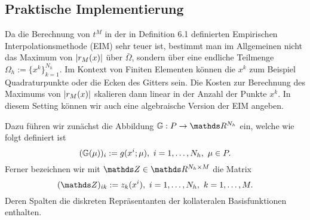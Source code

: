 \subsection{Praktische Implementierung}
Da die Berechnung von $t^M$ in der in Definition 6.1 definierten Empirischen Interpolationsmethode (EIM) sehr teuer ist, bestimmt man im Allgemeinen nicht das Maximum von $\left\vert r_M(x)\right\vert$ über $\bar{\Omega}$, sondern über eine endliche Teilmenge $\Omega_h := \{x^k\}_{k=1}^{N_h}$.
Im Kontext von Finiten Elementen können die $x^k$ zum Beispiel Quadraturpunkte oder die Ecken des Gitters sein.
Die Kosten zur Berechnung des Maximums von $\left\vert r_M(x)\right\vert$ skalieren dann linear in der Anzahl der Punkte $x^k$.
In diesem Setting können wir auch eine algebraische Version der EIM angeben.

Dazu führen wir zunächst die Abbildung $\mathbb{G}:P\to \R^{N_h}$ ein, welche wie folgt definiert ist
\[
(\mathbb{G}(\mu))_{i} := g(x^i;\mu),~i=1, \dots ,N_h,~\mu\in P.
\]
Ferner bezeichnen wir mit $\Z\in\R^{N_h\times M}$ die Matrix
\[
(\Z)_{ik} := z_k(x^i),~i=1\dt{,}N_h,~k=1\dt{,}M.
\]
Deren Spalten die diskreten Repräsentanten der kollateralen Basisfunktionen enthalten.

